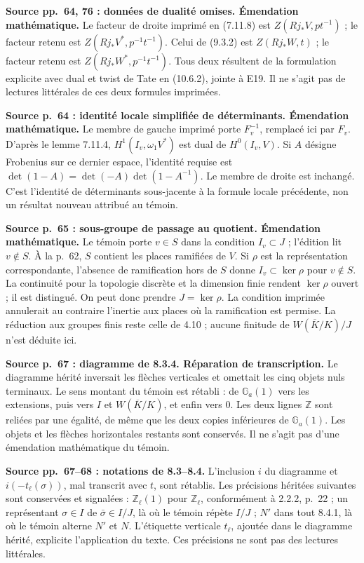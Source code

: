 \documentclass[10pt,letterpaper]{article}
\newcommand{\Z}{\mathbb Z}
\begin{document}
\begin{description}[style=nextline,leftmargin=2.6em,labelwidth=2.2em,font=\normalfont\bfseries]
\item[E20] \textbf{Source pp.~64, 76 : données de dualité omises. Émendation mathématique.} Le facteur de droite imprimé en (7.11.8) est \(Z(Rj_*V,pt^{-1})\) ; le facteur retenu est \(Z(Rj_*V^*,p^{-1}t^{-1})\). Celui de (9.3.2) est \(Z(Rj_*W,t)\) ; le facteur retenu est \(Z(Rj_*W^*,p^{-1}t^{-1})\). Tous deux résultent de la formulation explicite avec dual et twist de Tate en (10.6.2), jointe à E19. Il ne s'agit pas de lectures littérales de ces deux formules imprimées.

\item[E21] \textbf{Source p.~64 : identité locale simplifiée de déterminants. Émendation mathématique.} Le membre de gauche imprimé porte \(F_v^{-1}\), remplacé ici par \(F_v\). D'après le lemme 7.11.4, \(H^1(I_v,\omega_1 V^*)\) est dual de \(H^0(I_v,V)\). Si \(A\) désigne Frobenius sur ce dernier espace, l'identité requise est \(\det(1-A)=\det(-A)\det(1-A^{-1})\). Le membre de droite est inchangé. C'est l'identité de déterminants sous-jacente à la formule locale précédente, non un résultat nouveau attribué au témoin.
\item[E22] \textbf{Source p.~65 : sous-groupe de passage au quotient. Émendation mathématique.} Le témoin porte \(v\in S\) dans la condition \(I_v\subset J\) ; l'édition lit \(v\notin S\). À la p.~62, \(S\) contient les places ramifiées de \(V\). Si \(\rho\) est la représentation correspondante, l'absence de ramification hors de \(S\) donne \(I_v\subset\ker\rho\) pour \(v\notin S\). La continuité pour la topologie discrète et la dimension finie rendent \(\ker\rho\) ouvert ; il est distingué. On peut donc prendre \(J=\ker\rho\). La condition imprimée annulerait au contraire l'inertie aux places où la ramification est permise. La réduction aux groupes finis reste celle de 4.10 ; aucune finitude de \(W(\overline K/K)/J\) n'est déduite ici.
\item[E23] \textbf{Source p.~67 : diagramme de 8.3.4. Réparation de transcription.} Le diagramme hérité inversait les flèches verticales et omettait les cinq objets nuls terminaux. Le sens montant du témoin est rétabli : de \(\mathbb G_a(1)\) vers les extensions, puis vers \(I\) et \(W(\overline K/K)\), et enfin vers \(0\). Les deux lignes \(\Z\) sont reliées par une égalité, de même que les deux copies inférieures de \(\mathbb G_a(1)\). Les objets et les flèches horizontales restants sont conservés. Il ne s'agit pas d'une émendation mathématique du témoin.
\item[E24] \textbf{Source pp.~67--68 : notations de 8.3--8.4.} L'inclusion \(i\) du diagramme et \(i(-t_\ell(\sigma))\), mal transcrit avec \(t\), sont rétablis. Les précisions héritées suivantes sont conservées et signalées : \(\mathbb Z_\ell(1)\) pour \(\mathbb Z_\ell\), conformément à 2.2.2, p.~22 ; un représentant \(\sigma\in I\) de \(\bar\sigma\in I/J\), là où le témoin répète \(I/J\) ; \(N'\) dans tout 8.4.1, là où le témoin alterne \(N'\) et \(N\). L'étiquette verticale \(t_\ell\), ajoutée dans le diagramme hérité, explicite l'application du texte. Ces précisions ne sont pas des lectures littérales.

\end{description}
\end{document}
